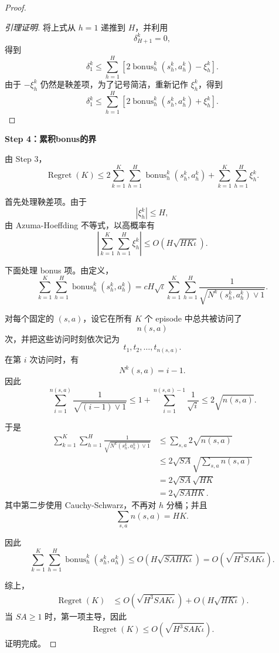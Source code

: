 \documentclass[11pt,a4paper]{article}
\theoremstyle{definition}
\begin{document}
\begin{proof}
\begin{proof}[引理证明]
将上式从 \(h=1\) 递推到 \(H\)，并利用
\[
\delta_{H+1}^k=0,
\]
得到
\[
\delta_1^k
\leq
\sum_{h=1}^H
\left[
2\operatorname{bonus}_h^k(s_h^k,a_h^k)
-
\xi_h^k
\right].
\]
由于 \(-\xi_h^k\) 仍然是鞅差项，为了记号简洁，重新记作 \(\xi_h^k\)，得到
\[
\delta_1^k
\leq
\sum_{h=1}^H
\left[
2\operatorname{bonus}_h^k(s_h^k,a_h^k)
+
\xi_h^k
\right].
\]
\end{proof}

\textbf{Step 4：累积bonus的界}

由 Step 3，
\[
\operatorname{Regret}(K)
\leq
2\sum_{k=1}^K\sum_{h=1}^H
\operatorname{bonus}_h^k(s_h^k,a_h^k)
+
\sum_{k=1}^K\sum_{h=1}^H
\xi_h^k.
\]

首先处理鞅差项。由于
\[
|\xi_h^k|\leq H,
\]
由 Azuma-Hoeffding 不等式，以高概率有
\[
\left|
\sum_{k=1}^K\sum_{h=1}^H
\xi_h^k
\right|
\leq
O\left(H\sqrt{HK\iota}\right).
\]

下面处理 bonus 项。由定义，
\[
\sum_{k=1}^K\sum_{h=1}^H
\operatorname{bonus}_h^k(s_h^k,a_h^k)
=
cH\sqrt{\iota}
\sum_{k=1}^K\sum_{h=1}^H
\frac{1}{
\sqrt{N^k(s_h^k,a_h^k)\vee 1}
}.
\]

对每个固定的 \((s,a)\)，设它在所有 \(K\) 个 episode 中总共被访问了
\[
n(s,a)
\]
次，并把这些访问时刻依次记为
\[
t_1,t_2,\ldots,t_{n(s,a)}.
\]
在第 \(i\) 次访问时，有
\[
N^k(s,a)=i-1.
\]
因此
\[
\sum_{i=1}^{n(s,a)}
\frac{1}{\sqrt{(i-1)\vee 1}}
\leq
1+\sum_{i=1}^{n(s,a)-1}\frac{1}{\sqrt{i}}
\leq
2\sqrt{n(s,a)}.
\]

于是
\begin{align*}
\sum_{k=1}^K\sum_{h=1}^H
\frac{1}{
\sqrt{N^k(s_h^k,a_h^k)\vee 1}
}
&\leq
\sum_{s,a}2\sqrt{n(s,a)}
\\
&\leq
2\sqrt{SA}
\sqrt{\sum_{s,a}n(s,a)}
\\
&=
2\sqrt{SA}
\sqrt{HK}
\\
&=
2\sqrt{SAHK}.
\end{align*}
其中第二步使用 Cauchy-Schwarz，不再对 \(h\) 分桶；并且
\[
\sum_{s,a}n(s,a)=HK.
\]

因此
\[
\sum_{k=1}^K\sum_{h=1}^H
\operatorname{bonus}_h^k(s_h^k,a_h^k)
\leq
O\left(
H\sqrt{SAHK\iota}
\right)
=
O\left(
\sqrt{H^3SAK\iota}
\right).
\]

综上，
\begin{align*}
\operatorname{Regret}(K)
&\leq
O\left(
\sqrt{H^3SAK\iota}
\right)
+
O\left(
H\sqrt{HK\iota}
\right).
\end{align*}
当 \(SA\geq 1\) 时，第一项主导，因此
\[
\operatorname{Regret}(K)
\leq
O\left(
\sqrt{H^3SAK\iota}
\right).
\]
证明完成。
\end{proof}
\end{document}
